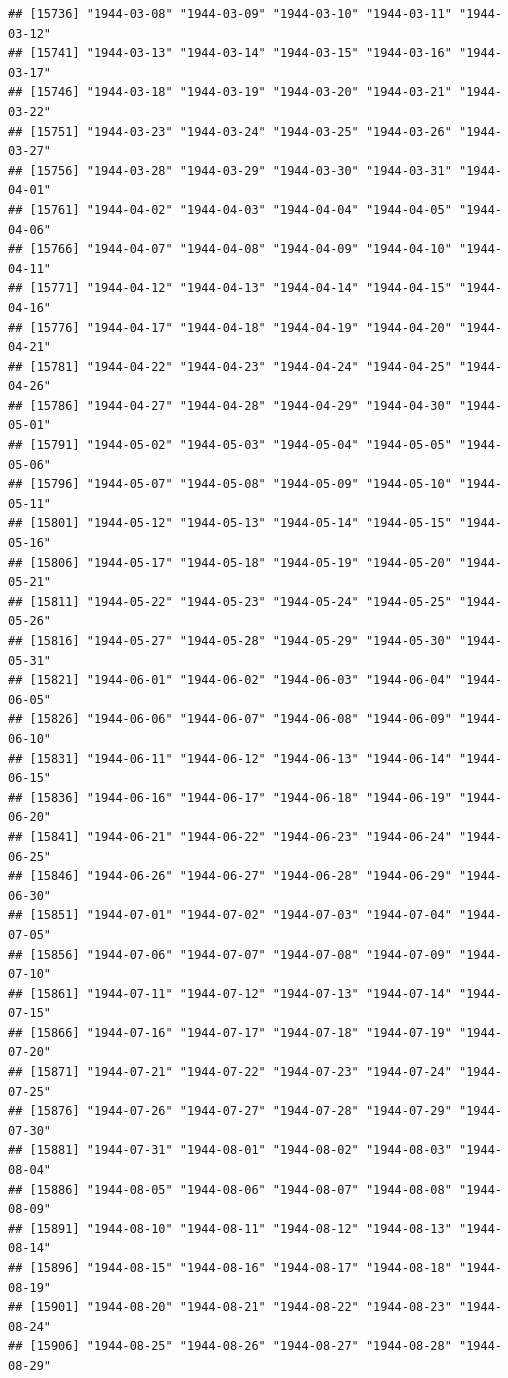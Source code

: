 \documentclass{article}\usepackage[]{graphicx}\usepackage[]{color}
\makeatletter
\newenvironment{kframe}{%
 \def\at@end@of@kframe{}%
 \ifinner\ifhmode%
  \def\at@end@of@kframe{\end{minipage}}%
  \begin{minipage}{\columnwidth}%
 \fi\fi%
 \def\FrameCommand##1{\hskip\@totalleftmargin \hskip-\fboxsep
 \colorbox{shadecolor}{##1}\hskip-\fboxsep
     \hskip-\linewidth \hskip-\@totalleftmargin \hskip\columnwidth}%
 \MakeFramed {\advance\hsize-\width
   \@totalleftmargin\z@ \linewidth\hsize
   \@setminipage}}%
 {\par\unskip\endMakeFramed%
 \at@end@of@kframe}
\newenvironment{knitrout}{}{} %
\makeatother
\begin{document}
\begin{description}
\begin{knitrout}
\begin{kframe}
\begin{verbatim}
## [15736] "1944-03-08" "1944-03-09" "1944-03-10" "1944-03-11" "1944-03-12"
## [15741] "1944-03-13" "1944-03-14" "1944-03-15" "1944-03-16" "1944-03-17"
## [15746] "1944-03-18" "1944-03-19" "1944-03-20" "1944-03-21" "1944-03-22"
## [15751] "1944-03-23" "1944-03-24" "1944-03-25" "1944-03-26" "1944-03-27"
## [15756] "1944-03-28" "1944-03-29" "1944-03-30" "1944-03-31" "1944-04-01"
## [15761] "1944-04-02" "1944-04-03" "1944-04-04" "1944-04-05" "1944-04-06"
## [15766] "1944-04-07" "1944-04-08" "1944-04-09" "1944-04-10" "1944-04-11"
## [15771] "1944-04-12" "1944-04-13" "1944-04-14" "1944-04-15" "1944-04-16"
## [15776] "1944-04-17" "1944-04-18" "1944-04-19" "1944-04-20" "1944-04-21"
## [15781] "1944-04-22" "1944-04-23" "1944-04-24" "1944-04-25" "1944-04-26"
## [15786] "1944-04-27" "1944-04-28" "1944-04-29" "1944-04-30" "1944-05-01"
## [15791] "1944-05-02" "1944-05-03" "1944-05-04" "1944-05-05" "1944-05-06"
## [15796] "1944-05-07" "1944-05-08" "1944-05-09" "1944-05-10" "1944-05-11"
## [15801] "1944-05-12" "1944-05-13" "1944-05-14" "1944-05-15" "1944-05-16"
## [15806] "1944-05-17" "1944-05-18" "1944-05-19" "1944-05-20" "1944-05-21"
## [15811] "1944-05-22" "1944-05-23" "1944-05-24" "1944-05-25" "1944-05-26"
## [15816] "1944-05-27" "1944-05-28" "1944-05-29" "1944-05-30" "1944-05-31"
## [15821] "1944-06-01" "1944-06-02" "1944-06-03" "1944-06-04" "1944-06-05"
## [15826] "1944-06-06" "1944-06-07" "1944-06-08" "1944-06-09" "1944-06-10"
## [15831] "1944-06-11" "1944-06-12" "1944-06-13" "1944-06-14" "1944-06-15"
## [15836] "1944-06-16" "1944-06-17" "1944-06-18" "1944-06-19" "1944-06-20"
## [15841] "1944-06-21" "1944-06-22" "1944-06-23" "1944-06-24" "1944-06-25"
## [15846] "1944-06-26" "1944-06-27" "1944-06-28" "1944-06-29" "1944-06-30"
## [15851] "1944-07-01" "1944-07-02" "1944-07-03" "1944-07-04" "1944-07-05"
## [15856] "1944-07-06" "1944-07-07" "1944-07-08" "1944-07-09" "1944-07-10"
## [15861] "1944-07-11" "1944-07-12" "1944-07-13" "1944-07-14" "1944-07-15"
## [15866] "1944-07-16" "1944-07-17" "1944-07-18" "1944-07-19" "1944-07-20"
## [15871] "1944-07-21" "1944-07-22" "1944-07-23" "1944-07-24" "1944-07-25"
## [15876] "1944-07-26" "1944-07-27" "1944-07-28" "1944-07-29" "1944-07-30"
## [15881] "1944-07-31" "1944-08-01" "1944-08-02" "1944-08-03" "1944-08-04"
## [15886] "1944-08-05" "1944-08-06" "1944-08-07" "1944-08-08" "1944-08-09"
## [15891] "1944-08-10" "1944-08-11" "1944-08-12" "1944-08-13" "1944-08-14"
## [15896] "1944-08-15" "1944-08-16" "1944-08-17" "1944-08-18" "1944-08-19"
## [15901] "1944-08-20" "1944-08-21" "1944-08-22" "1944-08-23" "1944-08-24"
## [15906] "1944-08-25" "1944-08-26" "1944-08-27" "1944-08-28" "1944-08-29"

\end{verbatim}
\end{kframe}
\end{knitrout}
\end{description}
\end{document}
